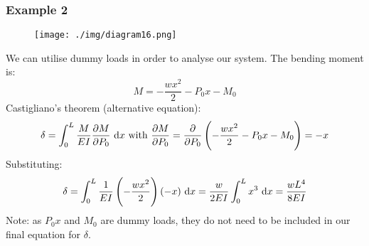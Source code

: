 \subsubsection{Example 2}
\begin{figure}[H]
  \centering
  \texttt{[image: ./img/diagram16.png]}
  \caption{}
\end{figure}
We can utilise dummy loads in order to analyse our system. The bending moment is:
\begin{equation}
  M = - \frac{wx^2}{2} - P_0 x - M_0
\end{equation}
Castigliano's theorem (alternative equation):
\begin{align}
  \delta = \int_0^L \frac{M}{EI} \frac{\partial M}{\partial P_0} \, \dif x \textrm{ with } \frac{\partial M}{\partial P_0} = \frac{\partial }{\partial P_0} \left(-\frac{wx^2}{2} - P_0 x - M_0\right) = -x
\end{align}
Substituting:
\begin{align}
  \delta = \int_0^L \frac{1}{EI} \left(-\frac{wx^2}{2}\right)\left(-x\right)\, \dif x = \frac{w}{2EI} \int_0^L x^3 \, \dif x = \frac{wL^4}{8EI}
\end{align}
Note: as $P_0 x$ and $M_0$ are dummy loads, they do not need to be included in our final equation for $\delta$.
